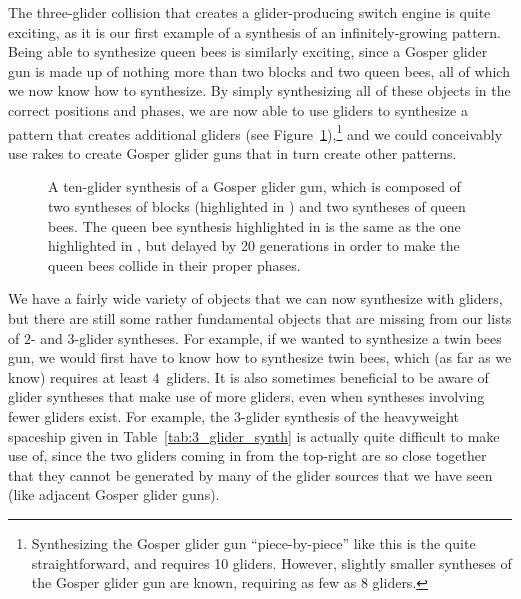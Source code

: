 The three-glider collision that creates a glider-producing switch engine is quite exciting, as it is our first example of a synthesis of an infinitely-growing pattern. Being able to synthesize queen bees is similarly exciting, since a Gosper glider gun is made up of nothing more than two blocks and two queen bees, all of which we now know how to synthesize. By simply synthesizing all of these objects in the correct positions and phases, we are now able to use gliders to synthesize a pattern that creates additional gliders (see Figure~\ref{fig:gosper_glider_synth}),\footnote{Synthesizing the Gosper glider gun ``piece-by-piece'' like this is the quite straightforward, and requires 10 gliders. However, slightly smaller syntheses of the Gosper glider gun are known, requiring as few as 8 gliders.} and we could conceivably use rakes to create Gosper glider guns that in turn create other patterns.

\begin{figure}[!htb]
	\centering{}
	\caption{A ten-glider synthesis of a Gosper glider gun, which is composed of two syntheses of blocks (highlighted in ) and two syntheses of queen bees. The queen bee synthesis highlighted in  is the same as the one highlighted in , but delayed by 20 generations in order to make the queen bees collide in their proper phases.}\label{fig:gosper_glider_synth}
\end{figure}

We have a fairly wide variety of objects that we can now synthesize with gliders, but there are still some rather fundamental objects that are missing from our lists of $2$- and $3$-glider syntheses. For example, if we wanted to synthesize a twin bees gun, we would first have to know how to synthesize twin bees, which (as far as we know) requires at least $4$~gliders. It is also sometimes beneficial to be aware of glider syntheses that make use of more gliders, even when syntheses involving fewer gliders exist. For example, the $3$-glider synthesis of the heavyweight spaceship given in Table~\ref{tab:3_glider_synth} is actually quite difficult to make use of, since the two gliders coming in from the top-right are so close together that they cannot be generated by many of the glider sources that we have seen (like adjacent Gosper glider guns).

